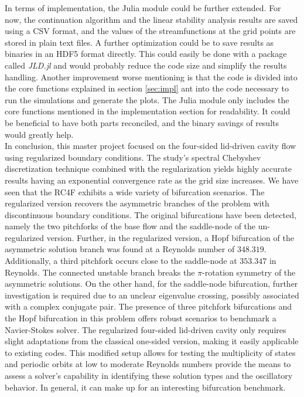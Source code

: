 In terms of implementation, the Julia module could be further extended. For
now, the continuation algorithm and the linear stability analysis results are
saved using a CSV format, and the values of the streamfunctions at the grid
points are stored in plain text files. A further optimization could be to save
results as binaries in an HDF5 format directly. This could easily be done with
a package called \emph{JLD.jl} and would probably reduce the code size and
simplify the results handling. Another improvement worse mentioning is that the
code is divided into the core functions explained in section \ref{sec:impl} ant
into the code necessary to run the simulations and generate the plots. The
Julia module only includes the core functions mentioned in the implementation
section for readability. It could be beneficial to have both parts reconciled,
and the binary savings of results would greatly help. \\

In conclusion, this master project focused on the four-sided lid-driven cavity
flow using regularized boundary conditions. The study's spectral Chebyshev
discretization technique combined with the regularization yields highly
accurate results having an exponential convergence rate as the grid size
increases. We have seen that the RC4F exhibits a wide variety of bifurcation
scenarios. The regularized version recovers the asymmetric branches of the
problem with discontinuous boundary conditions. The original bifurcations have
been detected, namely the two pitchforks of the base flow and the saddle-node
of the un-regularized version. Further, in the regularized version, a Hopf
bifurcation of the asymmetric solution branch was found at a Reynolds number of
$348.319$. Additionally, a third pitchfork occurs close to the saddle-node at
$353.347$ in Reynolds. The connected unstable branch breaks the $\pi$-rotation
symmetry of the asymmetric solutions. On the other hand, for the saddle-node
bifurcation, further investigation is required due to an unclear eigenvalue
crossing, possibly associated with a complex conjugate pair. The presence of
three pitchfork bifurcations and the Hopf bifurcation in this problem offers
robust scenarios to benchmark a Navier-Stokes solver. The regularized
four-sided lid-driven cavity only requires slight adaptations from the
classical one-sided version, making it easily applicable to existing codes.
This modified setup allows for testing the multiplicity of states and periodic
orbits at low to moderate Reynolds numbers provide the means to assess a
solver's capability in identifying these solution types and the oscillatory
behavior. In general, it can make up for an interesting bifurcation benchmark.
